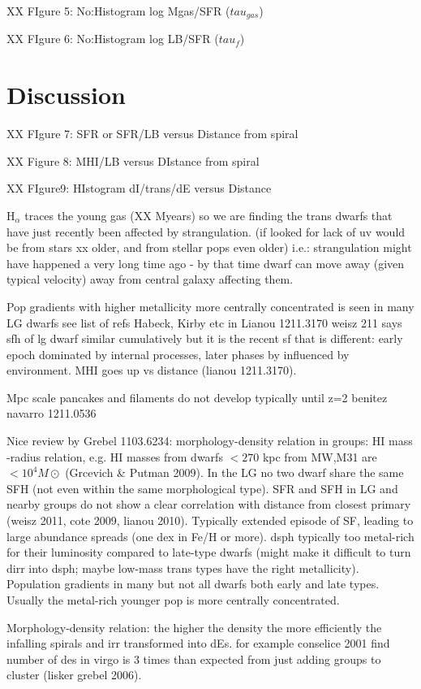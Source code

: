 \documentclass[12pt,preprint]{emulateapj}
\begin{document}
XX FIgure 5: No:Histogram log Mgas/SFR ($tau_{gas}$)

XX FIgure 6: No:Histogram log LB/SFR ($tau_f$)

\section{Discussion} 

XX FIgure 7: SFR or SFR/LB versus Distance from spiral

XX Figure 8: MHI/LB versus DIstance from spiral

XX FIgure9: HIstogram dI/trans/dE versus Distance

H$_\alpha$ traces the young gas (XX Myears) so we are finding the trans dwarfs that have just recently been affected by strangulation. (if looked for lack 
of uv would be from stars xx older, and from stellar pops even older) i.e.: strangulation might have happened a very long time ago - by that time dwarf can 
move away (given typical velocity) away from central galaxy affecting them.

Pop gradients with higher metallicity more centrally concentrated is seen in many LG dwarfs see list of refs Habeck, Kirby etc in Lianou 1211.3170
weisz 211 says sfh of lg dwarf similar cumulatively but it is the recent sf that is different: early epoch dominated by internal processes, later phases by 
influenced by environment. MHI goes up vs distance (lianou 1211.3170).

Mpc scale pancakes and filaments do not develop typically until z=2 benitez navarro 1211.0536

Nice review by Grebel 1103.6234: morphology-density relation in groups: HI mass -radius relation, e.g. HI masses from dwarfs $<270$ kpc from MW,M31 are
 $<10^4 M\odot$ (Grcevich \& Putman 2009). In the LG no two dwarf share the same SFH (not even within the same morphological type). SFR and SFH in 
 LG and nearby groups do not show a clear correlation with distance from closest primary (weisz 2011, cote 2009, lianou 2010). Typically extended episode 
of SF, leading to large abundance spreads (one dex in Fe/H or more). dsph typically too metal-rich for their luminosity compared to late-type dwarfs (might 
make it difficult to turn dirr into dsph; maybe low-mass trans types have the right metallicity). Population gradients in many but not all dwarfs both early and 
late types. Usually the metal-rich younger pop is more centrally concentrated.

Morphology-density relation: the higher the density the more efficiently the infalling spirals and irr transformed into dEs. for example conselice 2001 find 
number of des in virgo is 3 times than expected from just adding groups to cluster (lisker grebel 2006).
\end{document}
